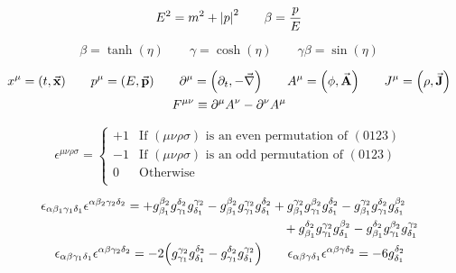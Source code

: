 \begin{equation*}
        E^2 = m^2 + \abs{p}^2
        \qquad
        \beta = \frac{p}{E}
\end{equation*}

\begin{equation*}
        \beta = \tanh(\eta)
        \qquad
        \gamma = \cosh(\eta)
        \qquad
        \gamma\beta = \sin(\eta)
\end{equation*}

\begin{gather*}
        x^{\mu} = (t, \va{x})
        \qquad
        p^{\mu} = (E, \va{p})
        \qquad
        \partial^{\mu} = \qty(\partial_t, -\va{\nabla})
        \qquad
        A^{\mu} = \qty(\phi, \va{A})
        \qquad
        J^{\mu} = \qty(\rho, \va{J})
        \\
        F^{\mu\nu} \equiv \partial^\mu A^\nu - \partial^\nu A^\mu
\end{gather*}

\begin{equation*}
        \epsilon^{\mu\nu\rho\sigma} = \begin{cases}
                +1 &\text{If $(\mu\nu\rho\sigma)$ is an even permutation of $(0123)$} \\
                -1 &\text{If $(\mu\nu\rho\sigma)$ is an odd permutation of $(0123)$} \\
                0  &\text{Otherwise} \\
        \end{cases}
\end{equation*}

\begin{gather*}
    \begin{multlined}
        \epsilon_{\alpha\beta_1\gamma_1\delta_1}\epsilon^{\alpha\beta_2\gamma_2\delta_2}
        =
        + g^{\beta_2}_{\beta_1}g^{\delta_2}_{\gamma_1}g^{\gamma_2}_{\delta_1}
        - g^{\beta_2}_{\beta_1}g^{\gamma_2}_{\gamma_1}g^{\delta_2}_{\delta_1}
        + g^{\gamma_2}_{\beta_1}g^{\beta_2}_{\gamma_1}g^{\delta_2}_{\delta_1}
        - g^{\gamma_2}_{\beta_1}g^{\delta_2}_{\gamma_1}g^{\beta_2}_{\delta_1}
        \\
        + g^{\delta_2}_{\beta_1}g^{\gamma_2}_{\gamma_1}g^{\beta_2}_{\delta_1}
        - g^{\delta_2}_{\beta_1}g^{\beta_2}_{\gamma_1}g^{\gamma_2}_{\delta_1}
    \end{multlined}
    \\
    \epsilon_{\alpha\beta\gamma_1\delta_1}\epsilon^{\alpha\beta\gamma_2\delta_2} = -2\qty(g_{\gamma_1}^{\gamma_2}g_{\delta_1}^{\delta_2} - g_{\gamma_1}^{\delta_2}g_{\delta_1}^{\gamma_2})
    \qquad
    \epsilon_{\alpha\beta\gamma\delta_1}\epsilon^{\alpha\beta\gamma\delta_2} = -6g_{\delta_1}^{\delta_2}
\end{gather*}

